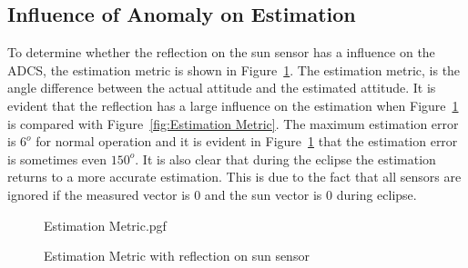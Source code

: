 %
%
%	
%	

\subsection{Influence of Anomaly on Estimation}
To determine whether the reflection on the sun sensor has a influence on the ADCS, the estimation metric is shown in Figure~\ref{fig:reflectionEstimation}. The estimation metric, is the angle difference between the actual attitude and the estimated attitude. It is evident that the reflection has a large influence on the estimation when Figure~\ref{fig:reflectionEstimation} is compared with Figure~\ref{fig:Estimation Metric}. The maximum estimation error is $6^o$ for normal operation and it is evident in Figure~\ref{fig:reflectionEstimation} that the estimation error is sometimes even $150^o$. It is also clear that during the eclipse the estimation returns to a more accurate estimation. This is due to the fact that all sensors are ignored if the measured vector is $0$ and the sun vector is $0$ during eclipse.
\begin{figure}[!htb]
	\centering
	
	{Estimation Metric.pgf}
	
	\caption{Estimation Metric with reflection on sun sensor}
	\label{fig:reflectionEstimation}
\end{figure}

